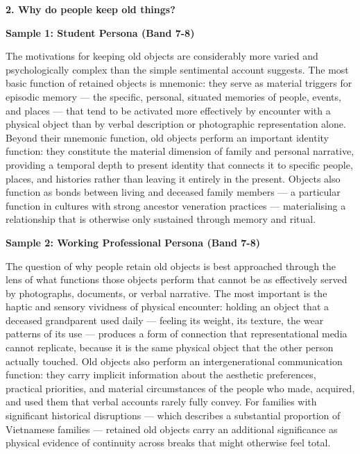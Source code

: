 \separator

\begin{ieltsquestion}
\textbf{2. Why do people keep old things?}
\end{ieltsquestion}
\textbf{Sample 1: Student Persona (Band 7-8)}

The motivations for keeping old objects are considerably more varied and psychologically complex than the simple sentimental account suggests. The most basic function of retained objects is mnemonic: they serve as material triggers for episodic memory — the specific, personal, situated memories of people, events, and places — that tend to be activated more effectively by encounter with a physical object than by verbal description or photographic representation alone. Beyond their mnemonic function, old objects perform an important identity function: they constitute the material dimension of family and personal narrative, providing a temporal depth to present identity that connects it to specific people, places, and histories rather than leaving it entirely in the present. Objects also function as bonds between living and deceased family members — a particular function in cultures with strong ancestor veneration practices — materialising a relationship that is otherwise only sustained through memory and ritual.

\textbf{Sample 2: Working Professional Persona (Band 7-8)}

The question of why people retain old objects is best approached through the lens of what functions those objects perform that cannot be as effectively served by photographs, documents, or verbal narrative. The most important is the haptic and sensory vividness of physical encounter: holding an object that a deceased grandparent used daily — feeling its weight, its texture, the wear patterns of its use — produces a form of connection that representational media cannot replicate, because it is the same physical object that the other person actually touched. Old objects also perform an intergenerational communication function: they carry implicit information about the aesthetic preferences, practical priorities, and material circumstances of the people who made, acquired, and used them that verbal accounts rarely fully convey. For families with significant historical disruptions — which describes a substantial proportion of Vietnamese families — retained old objects carry an additional significance as physical evidence of continuity across breaks that might otherwise feel total.

